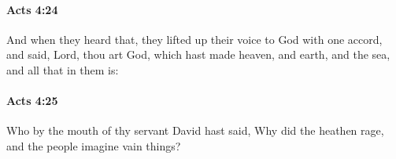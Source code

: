 		\paragraph{Acts 4:24} %
			\label{ACTS-4-24}

			And when they heard that, they lifted up their voice to God with one accord, and said, Lord, thou art God, which hast made heaven, and earth, and the sea, and all that in them is:

			\begin{framed}
			\scriptsize
				\begin{compactdesc}
					\item[SBLG] 
				\end{compactdesc}
			\end{framed}

		\paragraph{Acts 4:25} %
			\label{ACTS-4-25}

			Who by the mouth of thy servant David hast said, Why did the heathen rage, and the people imagine vain things?

